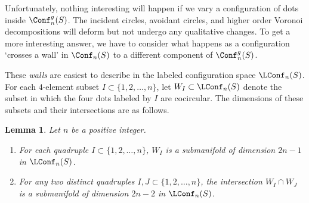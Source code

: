 \documentclass[11pt,oneside]{amsart}
\newtheorem{lemma}[thm]{Lemma}
\theoremstyle{definition}
\theoremstyle{remark}
\numberwithin{equation}{section}
\begin{document}
Unfortunately, nothing interesting will happen if we vary a configuration of dots inside $\Conf_n^g(S)$. The incident circles, avoidant circles, and higher order Voronoi decompositions will deform but not undergo any qualitative changes. 
To get a more interesting answer, we have to consider what happens as a configuration `crosses a wall' in $\Conf_n(S)$ to a different component of $\Conf_n^g(S)$.





%
These \emph{walls} are easiest to describe in the labeled configuration space $\LConf_n(S)$. For each $4$-element subset $I\subset \{1,2,\dotsc,n\}$, let
$
W_I\subset \LConf_n(S)
$
denote the subset in which the four dots labeled by $I$ are cocircular. The dimensions of these subsets and their intersections are as follows.

\begin{lemma}
Let $n$ be a positive integer.
\begin{enumerate}
    \item For each quadruple $I\subset \{1,2,\dotsc,n\}$, $W_I$ is a submanifold of dimension $2n-1$ in $\LConf_n(S)$.
    \item For any two distinct quadruples $I,J\subset \{1,2,\dotsc,n\}$, the intersection $W_I\cap W_J$ is a submanifold of dimension $2n-2$ in $\LConf_n(S)$.
\end{enumerate}
\end{lemma}

\end{document}
